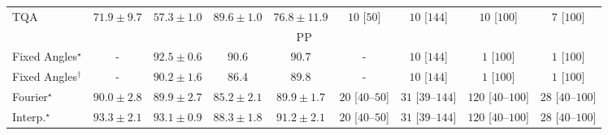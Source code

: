 \begin{tabular}{l|cccc|cccc|}
TQA & {\cellcolor[HTML]{FEAF3D}} \color[HTML]{000000} $71.9\pm 9.7$ & {\cellcolor[HTML]{FFF8C1}} \color[HTML]{000000} $57.3\pm 1.0$ & {\cellcolor[HTML]{AC3D03}} \color[HTML]{F1F1F1} $89.6\pm 1.0$ & {\cellcolor[HTML]{F88A21}} \color[HTML]{F1F1F1} $76.8\pm 11.9$ & {\cellcolor[HTML]{FFF6F2}} \color[HTML]{000000} $10$ [$50$] & {\cellcolor[HTML]{FFF6F2}} \color[HTML]{000000} $10$ [$144$] & {\cellcolor[HTML]{FFF6F2}} \color[HTML]{000000} $10$ [$100$] & {\cellcolor[HTML]{FFF6F2}} \color[HTML]{000000} $7$ [$100$] \\
\cline{1-9}
\multicolumn{9}{c}{\rule{0pt}{8pt}PP} \\
\midrule
Fixed Angles$^\star$ & {\cellcolor[HTML]{000000}} \color[HTML]{F1F1F1} {\cellcolor{white}} \color{black} - & {\cellcolor[HTML]{006335}} \color[HTML]{F1F1F1} $92.5\pm 0.6$ & {\cellcolor[HTML]{076D39}} \color[HTML]{F1F1F1} $90.6$ & {\cellcolor[HTML]{076D39}} \color[HTML]{F1F1F1} $90.7$ & {\cellcolor[HTML]{000000}} \color[HTML]{F1F1F1} {\cellcolor{white}} \color{black} - & {\cellcolor[HTML]{FFF6F2}} \color[HTML]{000000} $10$ [$144$] & {\cellcolor[HTML]{FFF7F3}} \color[HTML]{000000} $1$ [$100$] & {\cellcolor[HTML]{FFF7F3}} \color[HTML]{000000} $1$ [$100$] \\
Fixed Angles$^\dagger$ & {\cellcolor[HTML]{000000}} \color[HTML]{F1F1F1} {\cellcolor{white}} \color{black} - & {\cellcolor[HTML]{096F3A}} \color[HTML]{F1F1F1} $90.2\pm 1.6$ & {\cellcolor[HTML]{218242}} \color[HTML]{F1F1F1} $86.4$ & {\cellcolor[HTML]{0C723B}} \color[HTML]{F1F1F1} $89.8$ & {\cellcolor[HTML]{000000}} \color[HTML]{F1F1F1} {\cellcolor{white}} \color{black} - & {\cellcolor[HTML]{FFF6F2}} \color[HTML]{000000} $10$ [$144$] & {\cellcolor[HTML]{FFF7F3}} \color[HTML]{000000} $1$ [$100$] & {\cellcolor[HTML]{FFF7F3}} \color[HTML]{000000} $1$ [$100$] \\
Fourier$^\star$ & {\cellcolor[HTML]{0B713B}} \color[HTML]{F1F1F1} $90.0\pm 2.8$ & {\cellcolor[HTML]{0B713B}} \color[HTML]{F1F1F1} $89.9\pm 2.7$ & {\cellcolor[HTML]{288A47}} \color[HTML]{F1F1F1} $85.2\pm 2.1$ & {\cellcolor[HTML]{0B713B}} \color[HTML]{F1F1F1} $89.9\pm 1.7$ & {\cellcolor[HTML]{FFF3EF}} \color[HTML]{000000} $20$ [$40$--$50$] & {\cellcolor[HTML]{FEF1ED}} \color[HTML]{000000} $31$ [$39$--$144$] & {\cellcolor[HTML]{FDDAD7}} \color[HTML]{000000} $120$ [$40$--$100$] & {\cellcolor[HTML]{FEF1ED}} \color[HTML]{000000} $28$ [$40$--$100$] \\
Interp.$^\star$ & {\cellcolor[HTML]{005E33}} \color[HTML]{F1F1F1} $93.3\pm 2.1$ & {\cellcolor[HTML]{005F34}} \color[HTML]{F1F1F1} $93.1\pm 0.9$ & {\cellcolor[HTML]{15793E}} \color[HTML]{F1F1F1} $88.3\pm 1.8$ & {\cellcolor[HTML]{036B38}} \color[HTML]{F1F1F1} $91.2\pm 2.1$ & {\cellcolor[HTML]{FFF3EF}} \color[HTML]{000000} $20$ [$40$--$50$] & {\cellcolor[HTML]{FEF1ED}} \color[HTML]{000000} $31$ [$39$--$144$] & {\cellcolor[HTML]{FDDAD7}} \color[HTML]{000000} $120$ [$40$--$100$] & {\cellcolor[HTML]{FEF1ED}} \color[HTML]{000000} $28$ [$40$--$100$] \\

\end{tabular}
